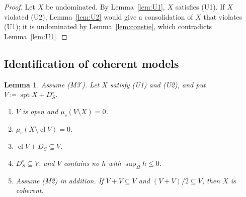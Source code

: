\documentclass[11pt]{article}
\DeclareMathOperator{\cl}{cl}
\DeclareMathOperator{\spt}{spt}
\theoremstyle{plain}
\newtheorem{lemma}[theorem]{Lemma}
\theoremstyle{definition}
\begin{document}
\begin{proof}
Let $X$ be undominated. By Lemma~\ref{lem:U1}, $X$ satisfies (U1). If $X$ violated (U2),
Lemma~\ref{lem:U2} would give a consolidation of $X$ that violates (U1); it is undominated by
Lemma~\ref{lem:constie}, which contradicts Lemma~\ref{lem:U1}.
\end{proof}

\subsection{Identification of coherent models}

\begin{lemma}\label{lem:open}
Assume (M3$'$). Let $X$ satisfy (U1) and (U2), and put $V\coloneqq\spt X+D_S^\circ$.
\begin{enumerate}[label=(\alph*)]
  \item $V$ is open and $\mu_c(V\setminus X)=0$.
  \item $\mu_c(X\setminus\cl V)=0$.
  \item $\cl V+D_S^\circ\subseteq V$.
  \item $D_S^\circ\subseteq V$, and $V$ contains no $h$ with $\sup_\Omega h\le0$.
  \item Assume (M2) in addition. If $V+V\subseteq V$ and $(V+V)/2\subseteq V$, then $X$ is
  coherent.
\end{enumerate}
\end{lemma}
\end{document}

